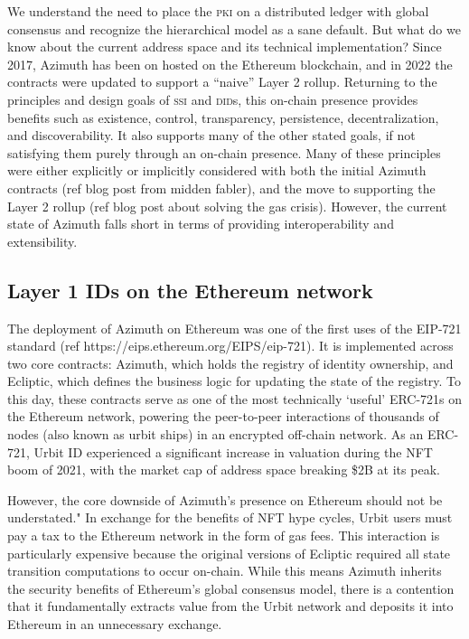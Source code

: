 \documentclass[twoside]{article}
\begin{document}
We understand the need to place the \textsc{pki} on a distributed ledger with global consensus and recognize the hierarchical model as a sane default. But what do we know about the current address space and its technical implementation? Since 2017, Azimuth has been on hosted on the Ethereum blockchain, and in 2022 the contracts were updated to support a ``naive'' Layer 2 rollup. Returning to the principles and design goals of \textsc{ssi} and \textsc{did}s, this on-chain presence provides benefits such as existence, control, transparency, persistence, decentralization, and discoverability. It also supports many of the other stated goals, if not satisfying them purely through an on-chain presence. Many of these principles were either explicitly or implicitly considered with both the initial Azimuth contracts (ref blog post from midden fabler), and the move to supporting the Layer 2 rollup (ref blog post about solving the gas crisis). However, the current state of Azimuth falls short in terms of providing interoperability and extensibility. 

\subsection{Layer 1 IDs on the Ethereum network}

The deployment of Azimuth on Ethereum was one of the first uses of the EIP-721 standard (ref https://eips.ethereum.org/EIPS/eip-721). It is implemented across two core contracts: Azimuth, which holds the registry of identity ownership, and Ecliptic, which defines the business logic for updating the state of the registry. To this day, these contracts serve as one of the most technically `useful' ERC-721s on the Ethereum network, powering the peer-to-peer interactions of thousands of nodes (also known as urbit ships) in an encrypted off-chain network. As an ERC-721, Urbit ID experienced a significant increase in valuation during the NFT boom of 2021, with the market cap of address space breaking \$2B at its peak.

However, the core downside of Azimuth's presence on Ethereum should not be understated." In exchange for the benefits of NFT hype cycles, Urbit users must pay a tax to the Ethereum network in the form of gas fees. This interaction is particularly expensive because the original versions of Ecliptic required all state transition computations to occur on-chain. While this means Azimuth inherits the security benefits of Ethereum's global consensus model, there is a contention that it fundamentally extracts value from the Urbit network and deposits it into Ethereum in an unnecessary exchange.
\end{document}
